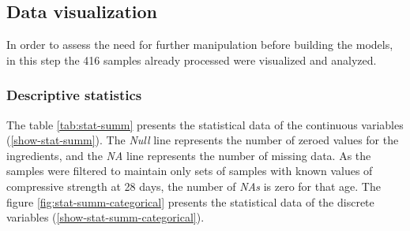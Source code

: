 \documentclass[
]{article}
\begin{document}
\begin{table}[H]

\caption{\label{tab:new-features-table}New features}
\centering
{}
\end{table}

\hypertarget{data-visualization}{%
\subsection{Data visualization}\label{data-visualization}}

In order to assess the need for further manipulation before building the
models, in this step the 416 samples already processed were visualized
and analyzed.

\hypertarget{descriptive-statistics}{%
\subsubsection{Descriptive statistics}\label{descriptive-statistics}}

The table \ref{tab:stat-summ} presents the statistical data of the
continuous variables (\ref {show-stat-summ}). The \emph{Null} line
represents the number of zeroed values for the ingredients, and the
\emph{NA} line represents the number of missing data. As the samples
were filtered to maintain only sets of samples with known values of
compressive strength at 28 days, the number of \emph{NAs} is zero for
that age. The figure \ref{fig:stat-summ-categorical} presents the
statistical data of the discrete variables
(\ref{show-stat-summ-categorical}).
\end{document}

